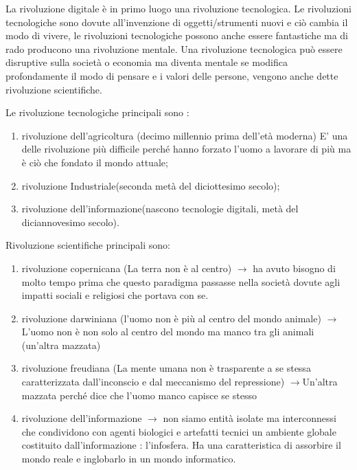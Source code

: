\documentclass[]{article}
\begin{document}
La rivoluzione digitale è in primo luogo una rivoluzione tecnologica. Le
rivoluzioni tecnologiche sono dovute all'invenzione di oggetti/strumenti
nuovi e ciò cambia il modo di vivere, le rivoluzioni tecnologiche
possono anche essere fantastiche ma di rado producono una rivoluzione
mentale. Una rivoluzione tecnologica può essere disruptive sulla società
o economia ma diventa mentale se modifica profondamente il modo di
pensare e i valori delle persone, vengono anche dette rivoluzione
scientifiche.

Le rivoluzione tecnologiche principali sono :

\begin{enumerate}
	\def\labelenumi{\arabic{enumi}.}
	 
	\item
	rivoluzione dell'agricoltura (decimo millennio prima dell'età moderna)
	E' una delle rivoluzione più difficile perché hanno forzato l'uomo a
	lavorare di più ma è ciò che fondato il mondo attuale;
	\item
	rivoluzione Industriale(seconda metà del diciottesimo secolo);
	\item
	rivoluzione dell'informazione(nascono tecnologie digitali, metà del
	diciannovesimo secolo).
\end{enumerate}

Rivoluzione scientifiche principali sono:

\begin{enumerate}
	\def\labelenumi{\arabic{enumi}.}
	 
	\item
	rivoluzione copernicana (La terra non è al centro) $\rightarrow$ ha avuto bisogno
	di molto tempo prima che questo paradigma passasse nella società
	dovute agli impatti sociali e religiosi che portava con se.
	\item
	rivoluzione darwiniana (l'uomo non è più al centro del mondo animale)
	$\rightarrow$ L'uomo non è non solo al centro del mondo ma manco tra gli animali
	(un'altra mazzata)
	\item
	rivoluzione freudiana (La mente umana non è trasparente a se stessa
	caratterizzata dall'inconscio e dal meccanismo del repressione)
	$\rightarrow$Un'altra mazzata perché dice che l'uomo manco capisce se stesso
	\item
	rivoluzione dell'informazione $\rightarrow$ non siamo entità isolate ma
	interconnessi che condividono con agenti biologici e artefatti tecnici
	un ambiente globale costituito dall'informazione : l'infosfera. Ha una
	caratteristica di assorbire il mondo reale e inglobarlo in un mondo
	informatico.
\end{enumerate}
\end{document}
